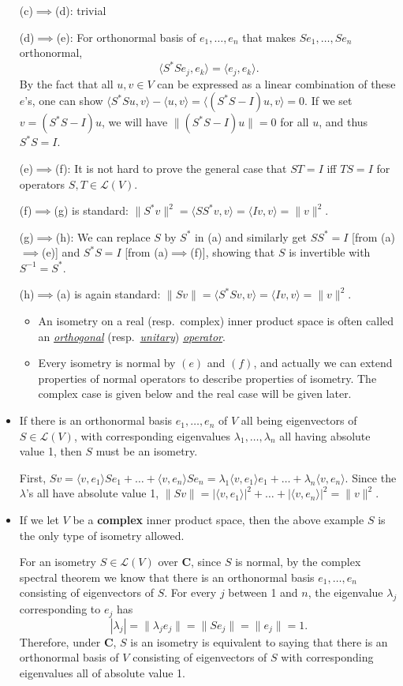\documentclass{article}
\newcommand{\df}[1]{\ul{\textit{#1}}}
\newcommand{\C}{\mathbf{C}}
\newcommand{\inp}[2]{\langle #1, #2 \rangle}
\newcommand{\nm}[1]{\| #1 \|}
\newcommand{\LV}{\mathcal{L}(V)}
\begin{document}
\begin{itemize}
    (c)$\implies$(d): trivial
    
    (d)$\implies$(e): For orthonormal basis of $e_1,\dots,e_n$ that makes $Se_1,\dots,Se_n$ orthonormal, $$\inp{S^*Se_j}{e_k}=\inp{e_j}{e_k}.$$ By the fact that all $u,v \in V$ can be expressed as a linear combination of these $e$'s, one can show $\inp{S^*Su}{v}-\inp{u}{v} = \inp{(S^*S-I)u}{v} = 0$. If we set $v = (S^*S-I)u$, we will have $\nm{(S^*S-I)u}=0$ for all $u$, and thus $S^*S=I$.
    
    (e)$\implies$(f): It is not hard to prove the general case that $ST = I$ iff $TS =I$ for operators $S,T \in \LV$.
    
    (f)$\implies$(g) is standard: $\nm{S^*v}^2=\inp{SS^*v}{v} = \inp{Iv}{v} = \nm{v}^2$.
    
    (g)$\implies$(h): We can replace $S$ by $S^*$ in (a) and similarly get $SS^*=I$ [from (a)$\implies$(e)] and $S^*S=I$ [from (a)$\implies$(f)], showing that $S$ is invertible with $S^{-1}=S^*$.
    
    (h)$\implies$(a) is again standard: $\nm{Sv} = \inp{S^*Sv}{v} = \inp{Iv}{v} = \nm{v}^2$.
    \begin{itemize}
        \item An isometry on a real (resp.\ complex) inner product space is often called an \df{orthogonal} (resp.\ \df{unitary}) \df{operator}.
        \item Every isometry is normal by $(e)$ and $(f)$, and actually we can extend properties of normal operators to describe properties of isometry. The complex case is given below and the real case will be given later.
    \end{itemize}
    \item If there is an orthonormal basis $e_1,\dots,e_n$ of $V$ all being eigenvectors of $S \in \LV$, with corresponding eigenvalues $\lambda_1,\dots,\lambda_n$ all having absolute value 1, then $S$ must be an isometry.
    
    First, $Sv = \inp{v}{e_1}Se_1 + \dots + \inp{v}{e_n}Se_n = \lambda_1\inp{v}{e_1}e_1 + \dots + \lambda_n\inp{v}{e_n}$. Since the $\lambda$'s all have absolute value 1, $\nm{Sv} = |\inp{v}{e_1}|^2 + \dots + |\inp{v}{e_n}|^2 = \nm{v}^2$.
    \item If we let $V$ be a \textbf{complex} inner product space, then the above example $S$ is the only type of isometry allowed.
    
    For an isometry $S \in \LV$ over $\C$, since $S$ is normal, by the complex spectral theorem we know that there is an orthonormal basis $e_1,\dots,e_n$ consisting of eigenvectors of $S$. For every $j$ between 1 and $n$, the eigenvalue $\lambda_j$ corresponding to $e_j$ has $$|\lambda_j|=\nm{\lambda_je_j}=\nm{Se_j}=\nm{e_j}=1.$$
    Therefore, under $\C$, $S$ is an isometry is equivalent to saying that there is an orthonormal basis of $V$ consisting of eigenvectors of $S$ with corresponding eigenvalues all of absolute value 1.
\end{itemize}
\end{document}
